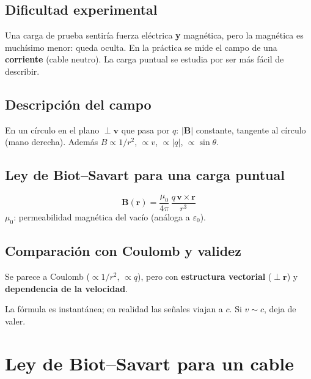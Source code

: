 \documentclass[12pt,a4paper]{article}
\begin{document}
\subsection{Dificultad experimental}

Una carga de prueba sentiría fuerza eléctrica \textbf{y} magnética, pero
la magnética es muchísimo menor: queda oculta. En la práctica se mide el
campo de una \textbf{corriente} (cable neutro). La carga puntual se
estudia por ser más fácil de describir.

\subsection{Descripción del campo}

En un círculo en el plano $\perp\mathbf{v}$ que pasa por $q$: $|\mathbf{B}|$
constante, tangente al círculo (mano derecha). Además $B\propto 1/r^2$,
$\propto v$, $\propto |q|$, $\propto \sin\theta$.

\subsection{Ley de Biot--Savart para una carga puntual}

\begin{keybox}
  \[
  \boxed{\mathbf{B}(\mathbf{r}) = \frac{\mu_0}{4\pi}\,
         \frac{q\,\mathbf{v}\times\mathbf{r}}{r^3}}
  \]
  $\mu_0$: permeabilidad magnética del vacío (análoga a $\varepsilon_0$).
\end{keybox}



\subsection{Comparación con Coulomb y validez}

Se parece a Coulomb ($\propto 1/r^2$, $\propto q$), pero con
\textbf{estructura vectorial} ($\perp\mathbf{r}$) y \textbf{dependencia de
la velocidad}.

\begin{warnbox}[Validez $v \ll c$]
  La fórmula es instantánea; en realidad las señales viajan a $c$. Si $v
  \sim c$, deja de valer.
\end{warnbox}

\section{Ley de Biot--Savart para un cable}
\end{document}
